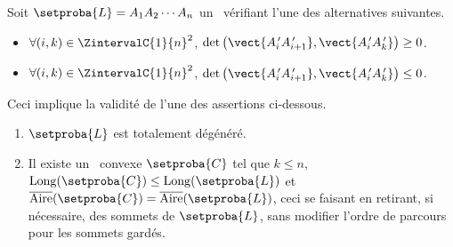 \begin{fact} \label{conv-from-non-neg-det}
    Soit $\setproba{L} = A_1 A_2 \cdots A_n$ un \ncycle\ vérifiant l'une des alternatives suivantes.
	\begin{itemize}
		\item $\forall (i, k) \in \ZintervalC{1}{n}^2$,
		$\det \big( \vect{A^{\,\prime}_i A^{\,\prime}_{i+1}}, \vect{A^{\,\prime}_i A^{\,\prime}_k} \big) \geq 0$.

		\item $\forall (i, k) \in \ZintervalC{1}{n}^2$,
		$\det \big( \vect{A^{\,\prime}_i A^{\,\prime}_{i+1}}, \vect{A^{\,\prime}_i A^{\,\prime}_k} \big) \leq 0$.
    \end{itemize}
    
    Ceci implique la validité de l'une des assertions ci-dessous.
	\begin{enumerate}[label=\roman*.]
		\item $\setproba{L}$ est totalement dégénéré.

		\item Il existe un \kgone\ convexe $\setproba{C}$ tel que
		$k \leq n$, 
		$\cyclelen{\setproba{C}} \leq \cyclelen{\setproba{L}}$
		et
		$\sarea{\setproba{C}} = \sarea{\setproba{L}}$,
		ceci se faisant en retirant, si nécessaire, des sommets de $\setproba{L}$, sans modifier l'ordre de parcours pour les sommets gardés.
    \end{enumerate}
\end{fact}


